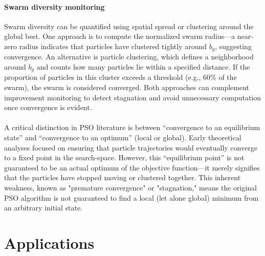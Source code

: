 {\paragraph{Swarm diversity monitoring} Swarm diversity can be quantified using spatial spread or clustering around the global best. One approach is to compute the normalized swarm radius---a near-zero radius indicates that particles have clustered tightly around $b_g$, suggesting convergence. An alternative is particle clustering, which defines a neighborhood around $b_g$ and counts how many particles lie within a specified distance. If the proportion of particles in this cluster exceeds a threshold (e.g., 60\% of the swarm), the swarm is considered converged.
Both approaches can complement improvement monitoring to detect stagnation and avoid unnecessary computation once convergence is evident.

\paragraph{}


A critical distinction in PSO literature is between ``convergence to an equilibrium state'' and ``convergence to an optimum'' (local or global). Early theoretical analyses \citep[][]{vandenbergh2002analysis} focused on ensuring that particle trajectories would eventually converge to a fixed point in the \gls{search-space}. However, this ``equilibrium point'' is not guaranteed to be an actual optimum of the objective function---it merely signifies that the particles have stopped moving or clustered together. This inherent weakness, known as "premature convergence" or "stagnation," means the original PSO algorithm is not guaranteed to find a local (let alone global) minimum from an arbitrary initial state.


\section{Applications}

}
